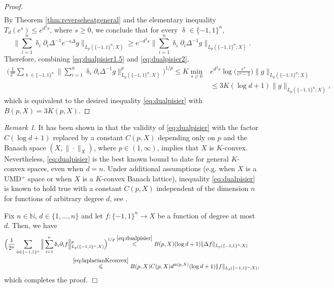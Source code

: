 \documentclass[11pt,reqno]{amsart}
\renewcommand{\leq}{\leqslant}
\renewcommand{\geq}{\geqslant}
\newcommand{\1}{\mathbf 1}
\theoremstyle{remark}
\newtheorem{remark}[theorem]{Remark}
\newcommand{\N}{\mathbb N}
\renewcommand{\alpha}{\upalpha}
\renewcommand{\delta}{\updelta}
\begin{document}
\begin{proof}
\begin{equation}
\begin{split}
\end{split}
\end{equation}
By Theorem \ref{thm:reverseheatgeneral} and the elementary inequality $T_d(e^s)\leq e^{d^2s}$, where $s\geq0$, we conclude that for every $\delta\in\{-1,1\}^n$,
\begin{equation} \label{eq:dualpisier2}
\Big\| \sum_{i=1}^n\delta_i\partial_i \Delta^{-1} e^{-s\Delta} g\Big\|_{L_p(\{-1,1\}^n;X)} \geq e^{-d^2s} \Big\| \sum_{i=1}^n\delta_i\partial_i \Delta^{-1} g\Big\|_{L_p(\{-1,1\}^n;X)}.
\end{equation}
Therefore, combining \eqref{eq:dualpisier1.5} and \eqref{eq:dualpisier2},
\begin{equation}
\begin{split}
\Big(\frac{1}{2^n}\sum_{\delta\in\{-1,1\}^n} \Big\| \sum_{i=1}^n\delta_i\partial_i\Delta^{-1} g\Big\|_{L_p(\{-1,1\}^n;X)}^p \Big)^{1/p} \leq K \min_{s\geq0}& e^{d^2s}\log\Big(\frac{e^s}{e^s-1}\Big)  \|g\|_{L_p(\{-1,1\}^n;X)}
\\ & \leq 3K(\log d+1) \|g\|_{L_p(\{-1,1\}^n;X)},
\end{split}
\end{equation}
which is equivalent to the desired inequality \eqref{eq:dualpisier} with $B(p,X)=3K(p,X)$.
\end{proof}

\begin{remark}
It has been shown in \cite{NS02} that the validity of \eqref{eq:dualpisier} with the factor $C(\log d+1)$ replaced by a constant $C(p,X)$ depending only on $p$ and the Banach space $(X,\|\cdot\|_X)$, where $p\in(1,\infty)$, implies that $X$ is $K$-convex. Nevertheless, \eqref{eq:dualpisier} is the best known bound to date for general $K$-convex spaces, even when $d=n$. Under additional assumptions (e.g. when $X$ is a UMD$^+$ space or when $X$ is a $K$-convex Banach lattice), inequality \eqref{eq:dualpisier} is known to hold true with a constant $C(p,X)$ independent of the dimension $n$ for functions of arbitrary degree $d$, see \cite{HN13}.
\end{remark}

 Fix $n\in\N$, $d\in\{1,\ldots,n\}$ and let $f:\{-1,1\}^n\to X$ be a function of degree at most $d$. Then, we have
\begin{equation}
\begin{split}
\Big(\frac{1}{2^n}\sum_{\delta\in\{-1,1\}^n} \Big\| \sum_{i=1}^n\delta_i\partial_i f\Big\|&^p_{L_p(\{-1,1\}^n;X)}  \Big)^{1/p} \stackrel{\eqref{eq:dualpisier}}{\leq} B(p,X)(\log d+1) \|\Delta f\|_{L_p(\{-1,1\}^n;X)}
\\ & \stackrel{\eqref{eq:laplacianKconvex}}{\leq} B(p,X) C(p,X) d^{\alpha(p,X)} (\log d+1)  \|f\|_{L_p(\{-1,1\}^n;X)},
\end{split}
\end{equation}
which completes the proof.
\hfill$\Box$
\end{document}
